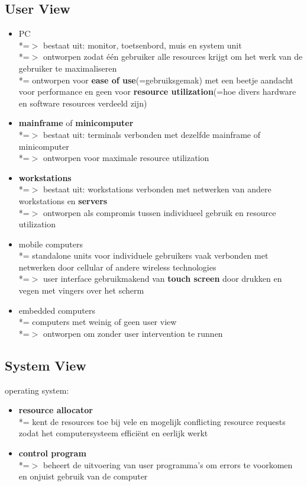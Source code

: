 \documentclass{report}
\begin{document}
\subsection{User View}
\begin{itemize}
	\item PC
	\\*=$>$ bestaat uit: monitor, toetsenbord, muis en system unit
	\\*=$>$ ontworpen zodat \'e\'en gebruiker alle resources krijgt om het werk van de gebruiker te maximaliseren
	\\*= ontworpen voor \textbf{ease of use}(=gebruiksgemak) met een beetje aandacht voor performance en geen voor \textbf{resource utilization}(=hoe divers hardware en software resources verdeeld zijn)
	\item \textbf{mainframe} of \textbf{minicomputer}
	\\*=$>$ bestaat uit: terminals verbonden met dezelfde mainframe of minicomputer
	\\*=$>$ ontworpen voor maximale resource utilization
	\item \textbf{workstations}
	\\*=$>$ bestaat uit: workstations verbonden met netwerken van andere workstations en \textbf{servers}
	\\*=$>$ ontworpen als compromis tussen individueel gebruik en resource utilization
	\item mobile computers
	\\*= standalone units voor individuele gebruikers vaak verbonden met netwerken door cellular of andere wireless technologies
	\\*=$>$ user interface gebruikmakend van \textbf{touch screen} door drukken en vegen met vingers over het scherm
	\item embedded computers
	\\*= computers met weinig of geen user view
	\\*=$>$ ontworpen om zonder user intervention te runnen
\end{itemize}

\subsection{System View}
operating system:
\begin{itemize}
	\item\textbf{resource allocator}
	\\*= kent de resources toe bij vele en mogelijk conflicting resource requests zodat het computersysteem effici\"ent en eerlijk werkt
	\item\textbf{control program} 
	\\*=$>$ beheert de uitvoering van user programma's om errors te voorkomen en onjuist gebruik van de computer
\end{itemize}
\end{document}
